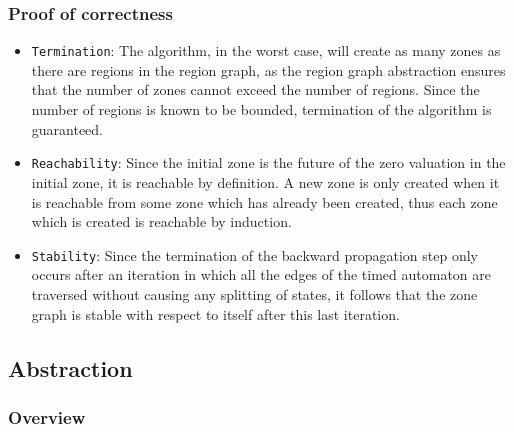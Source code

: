 \documentclass[a4paper]{llncs}
\begin{document}
\subsubsection{Proof of correctness}

\begin{itemize}

\item \texttt{Termination}: The algorithm, in the worst case,
  will create as many zones as there are regions in the region graph,
  as the region graph abstraction ensures that the number of zones
  cannot exceed the number of regions. Since the number of regions is
  known to be bounded, termination of the algorithm is
  guaranteed.

\item \texttt{Reachability}: Since the initial zone is the future of
  the zero valuation in the initial zone, it is reachable by
  definition. A new zone is only created when it is reachable from some
  zone which has already been created, thus each zone which is created
  is reachable by induction.

\item \texttt{Stability}: Since the termination of the backward
  propagation step only occurs after an iteration in which all the
  edges of the timed automaton are traversed without causing any
  splitting of states, it follows that the zone graph is stable with
  respect to itself after this last iteration.

\end{itemize}

\subsection{Abstraction}

\subsubsection{Overview}
\end{document}
